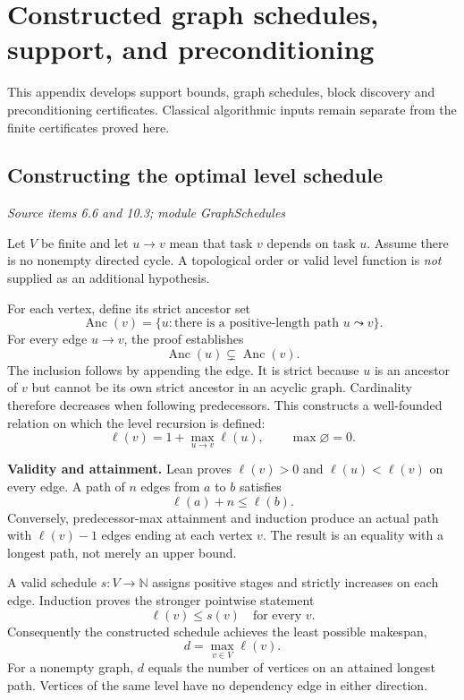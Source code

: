 \clearpage\FloatBarrier\section{Constructed graph schedules, support, and preconditioning}\label{supp5:section:001}
This appendix develops support bounds, graph schedules, block discovery and preconditioning certificates. Classical algorithmic inputs remain separate from the finite certificates proved here.\par

\subsection{Constructing the optimal level schedule}\label{supp5:subsection:001}\textit{Source items 6.6 and 10.3; module GraphSchedules}\par
Let $V$ be finite and let $u\to v$ mean that task $v$ depends on task $u$. Assume there is no nonempty directed cycle. A topological order or valid level function is \emph{not} supplied as an additional hypothesis.

For each vertex, define its strict ancestor set
\[
\operatorname{Anc}(v)=\{u:\text{there is a positive-length path }u\leadsto v\}.
\]
For every edge $u\to v$, the proof establishes
\[
\operatorname{Anc}(u)\subsetneq\operatorname{Anc}(v).
\]
The inclusion follows by appending the edge. It is strict because $u$ is an ancestor of $v$ but cannot be its own strict ancestor in an acyclic graph. Cardinality therefore decreases when following predecessors. This constructs a well-founded relation on which the level recursion is defined:
\[
\boxed{\ell(v)=1+\max_{u\to v}\ell(u),\qquad \max\varnothing=0.}
\]

\textbf{Validity and attainment.} Lean proves $\ell(v)>0$ and $\ell(u)<\ell(v)$ on every edge. A path of $n$ edges from $a$ to $b$ satisfies
\[
\ell(a)+n\leq\ell(b).
\]
Conversely, predecessor-max attainment and induction produce an actual path with $\ell(v)-1$ edges ending at each vertex $v$. The result is an equality with a longest path, not merely an upper bound.

A valid schedule $s:V\to\mathbb N$ assigns positive stages and strictly increases on each edge. Induction proves the stronger pointwise statement
\[
\ell(v)\leq s(v)\quad\text{for every }v.
\]
Consequently the constructed schedule achieves the least possible makespan,
\[
\boxed{d=\max_{v\in V}\ell(v).}
\]
For a nonempty graph, $d$ equals the number of vertices on an attained longest path. Vertices of the same level have no dependency edge in either direction.

